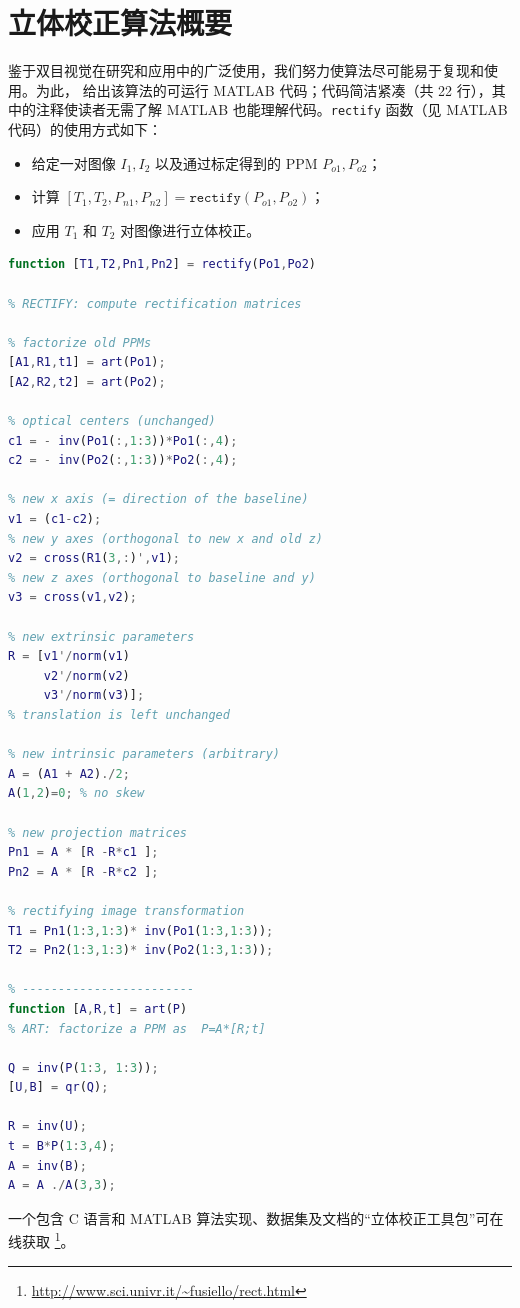 
\section{立体校正算法概要}
\label{sec:rectification-algorithm}

鉴于双目视觉在研究和应用中的广泛使用，我们努力使算法尽可能易于复现和使用。为此，
给出该算法的可运行 MATLAB 代码；代码简洁紧凑（共 22 行），其中的注释使读者无需了解
MATLAB 也能理解代码。\texttt{rectify} 函数（见 MATLAB 代码）的使用方式如下：

\begin{itemize}
  \item 给定一对图像 $I_1,I_2$ 以及通过标定得到的 PPM $P_{o1},P_{o2}$；
  \item 计算 $[T_1,T_2,P_{n1},P_{n2}]=\texttt{rectify}(P_{o1},P_{o2})$；
  \item 应用 $T_1$ 和 $T_2$ 对图像进行立体校正。
\end{itemize}

\begin{lstlisting}[language=Matlab]
function [T1,T2,Pn1,Pn2] = rectify(Po1,Po2)

% RECTIFY: compute rectification matrices

% factorize old PPMs
[A1,R1,t1] = art(Po1);
[A2,R2,t2] = art(Po2);

% optical centers (unchanged)
c1 = - inv(Po1(:,1:3))*Po1(:,4);
c2 = - inv(Po2(:,1:3))*Po2(:,4);

% new x axis (= direction of the baseline)
v1 = (c1-c2);
% new y axes (orthogonal to new x and old z)
v2 = cross(R1(3,:)',v1);
% new z axes (orthogonal to baseline and y)
v3 = cross(v1,v2);

% new extrinsic parameters
R = [v1'/norm(v1)
     v2'/norm(v2)
     v3'/norm(v3)];
% translation is left unchanged

% new intrinsic parameters (arbitrary)
A = (A1 + A2)./2;
A(1,2)=0; % no skew

% new projection matrices
Pn1 = A * [R -R*c1 ];
Pn2 = A * [R -R*c2 ];

% rectifying image transformation
T1 = Pn1(1:3,1:3)* inv(Po1(1:3,1:3));
T2 = Pn2(1:3,1:3)* inv(Po2(1:3,1:3));

% ------------------------
function [A,R,t] = art(P)
% ART: factorize a PPM as  P=A*[R;t]

Q = inv(P(1:3, 1:3));
[U,B] = qr(Q);

R = inv(U);
t = B*P(1:3,4);
A = inv(B);
A = A ./A(3,3);
\end{lstlisting}

一个包含 C 语言和 MATLAB 算法实现、数据集及文档的“立体校正工具包”可在线获取
\footnote{\url{http://www.sci.univr.it/~fusiello/rect.html}}。
